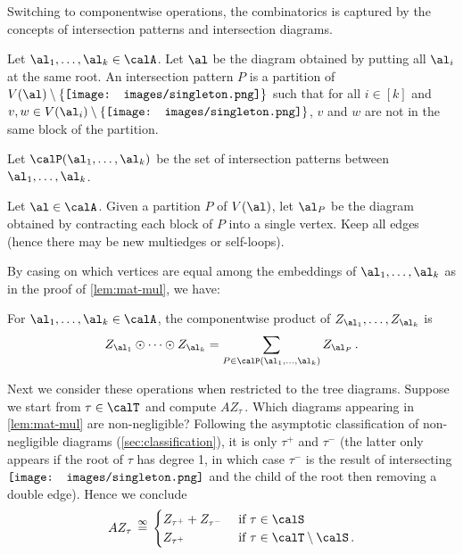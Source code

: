 \documentclass[12pt]{article}
\newcommand{\rootpic}{\vcenter{\hbox{\texttt{[image: images/singleton.png]}}}}
\newcommand{\eqinf}{\,\overset{\infty}{=}\,}
\begin{document}
Switching to componentwise operations, the combinatorics is captured by the concepts of intersection patterns and intersection diagrams.

\begin{definition}
\label{def:intersection-pattern}
    Let $\al_1, \dots, \al_k \in \calA$. Let $\al$
    be the diagram obtained by putting all $\al_i$ at the same root.
    An intersection pattern $P$ is a partition of $V(\al)\setminus \{\rootpic\}$
    such that for all $i\in[k]$ and $v,w \in V(\al_i)\setminus\{\rootpic\}$, $v$ and $w$
    are not in the same block of the partition.

    Let $\calP(\al_1, \dots, \al_k)$ be the set of intersection patterns between $\al_1, \dots, \al_k$.
\end{definition}

\begin{definition}
\label{def:intersection-diagram}
    Let $\al \in \calA$.
    Given a partition $P$ of $V(\al)$,
    let $\al_P$ be the diagram obtained by contracting
    each block of $P$ into a single vertex. Keep all edges
    (hence there may be new multiedges or self-loops).
\end{definition}


By casing on which vertices are equal among the embeddings
of $\al_1, \dots, \al_k$ as in the proof of \cref{lem:mat-mul}, we have:
\begin{lemma}\label{lem:diagrams-product}
    For $\al_1, \dots, \al_k \in \calA$, the componentwise product of $Z_{\al_1},\ldots,Z_{\al_k}$ is
    \[Z_{\al_1} \odot \cdots \odot Z_{\al_k} = \sum_{P \in \calP(\al_1, \dots, \al_k)} Z_{\al_P}\,.\]
\end{lemma}


Next we consider these operations when restricted to the tree diagrams.
Suppose we start from $\tau \in \calT$ and compute $AZ_\tau\,$.
Which diagrams appearing in \cref{lem:mat-mul} are non-negligible?
Following the asymptotic classification of non-negligible diagrams (\cref{sec:classification}),
it is only $\tau^+$ and $\tau^-$ (the latter only appears if the root of $\tau$ has degree 1, in which case $\tau^-$ is the result of intersecting $\rootpic$ and the child of the root then removing a double edge).
Hence we conclude
\[AZ_\tau \eqinf \begin{cases}
    Z_{\tau^+} + Z_{\tau^-} & \text{ if }\tau \in \calS\\
    Z_{\tau^+}& \text{ if }\tau \in \calT \setminus \calS\,.
\end{cases}\]
\end{document}
